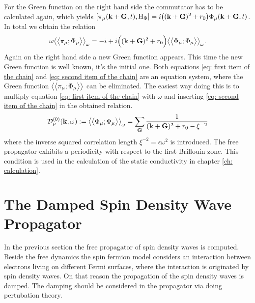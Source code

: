 For the Green function on the right hand side the commutator has to be calculated again, which yields $\comm{\pi_{\mu}(\vb{k}+\vb{G},t)}{\mt{H}_{\Phi}} = i \big((\vb{k}+\vb{G})^{2} + r_{0}\big) \Phi_{\mu}(\vb{k}+\vb{G},t)$.
In total we obtain the relation
%
\begin{align}
	\omega \big\langle\big\langle{\pi_{\mu}};{\Phi_{\mu}}\big\rangle\big\rangle_{\omega} = 
		-i + i\Big((\vb{k}+\vb{G})^{2} + r_{0} \Big) \big\langle\big\langle{\Phi_{\mu}};{\Phi_{\mu}}\big\rangle\big\rangle_{\omega}.
		\label{eq: second item of the chain}
\end{align}
%
Again on the right hand side a new Green function appears.
This time the new Green function is well known, it's the initial one.
Both equations \eqref{eq: first item of the chain} and \eqref{eq: second item of the chain} are an equation system, where the Green function $\big\langle\big\langle{\pi_{\mu}};{\Phi_{\mu}}\big\rangle\big\rangle$ can be eliminated.
The easiest way doing this is to multiply equation \eqref{eq: first item of the chain} with $\omega$ and inserting \eqref{eq: second item of the chain} in the obtained relation.
%
\begin{align}
	\mathcal{D}_{\mu}^{(0)}(\vb{k},\omega) := \big\langle\big\langle{\Phi_{\mu}};{\Phi_{\mu}}\big\rangle\big\rangle_{\omega} = \sum\limits_{\vb{G}} \frac{1}{(\vb{k}+\vb{G})^{2} + r_{0} - \xi^{-2}}
	\label{eq: free spin density wave propagator}
\end{align}
%
where the inverse squared correlation length $\xi^{-2} = \epsilon \omega^{2}$ is introduced.
The free propagator exhibits a periodicity with respect to the first Brillouin zone.
This condition is used in the calculation of the static conductivity in chapter \ref{ch: calculation}. 
%
%
\section{The Damped Spin Density Wave Propagator}
\label{sec: damped propagator}
%
%
In the previous section the free propagator of spin density waves is computed.
Beside the free dynamics the spin fermion model considers an interaction between electrons living on different Fermi surfaces, where the interaction is originated by spin density waves.
On that reason the propagation of the spin density waves is damped.
The damping should be considered in the propagator via doing pertubation theory.

